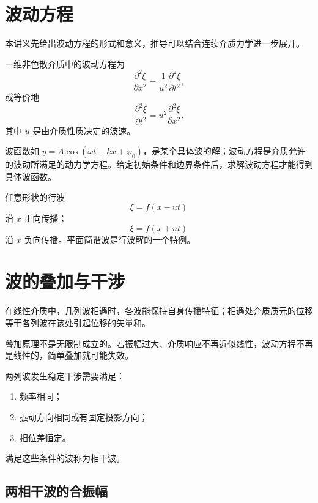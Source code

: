 \section{波动方程}

本讲义先给出波动方程的形式和意义，推导可以结合连续介质力学进一步展开。

\begin{definition}[一维波动方程]\label{def:one-dimensional-wave-equation}
一维非色散介质中的波动方程为
\[
  \frac{\partial^2 \xi}{\partial x^2}
  =\frac{1}{u^2}\frac{\partial^2 \xi}{\partial t^2},
\]
或等价地
\[
  \frac{\partial^2 \xi}{\partial t^2}
  =u^2\frac{\partial^2 \xi}{\partial x^2}.
\]
其中 $u$ 是由介质性质决定的波速。
\end{definition}

\begin{attention}
波函数如 $y=A\cos(\omega t-kx+\varphi_0)$，是某个具体波的解；波动方程是介质允许的波动所满足的动力学方程。给定初始条件和边界条件后，求解波动方程才能得到具体波函数。
\end{attention}

任意形状的行波
\[
  \xi=f(x-ut)
\]
沿 $x$ 正向传播；
\[
  \xi=f(x+ut)
\]
沿 $x$ 负向传播。平面简谐波是行波解的一个特例。

\section{波的叠加与干涉}

\begin{definition}[波的叠加原理]\label{def:wave-superposition}
在线性介质中，几列波相遇时，各波能保持自身传播特征；相遇处介质质元的位移等于各列波在该处引起位移的矢量和。
\end{definition}

叠加原理不是无限制成立的。若振幅过大、介质响应不再近似线性，波动方程不再是线性的，简单叠加就可能失效。

\begin{definition}[干涉条件]\label{def:interference-condition}
两列波发生稳定干涉需要满足：
\begin{enumerate}
  \item 频率相同；
  \item 振动方向相同或有固定投影方向；
  \item 相位差恒定。
\end{enumerate}
满足这些条件的波称为相干波。
\end{definition}

\subsection*{两相干波的合振幅}

